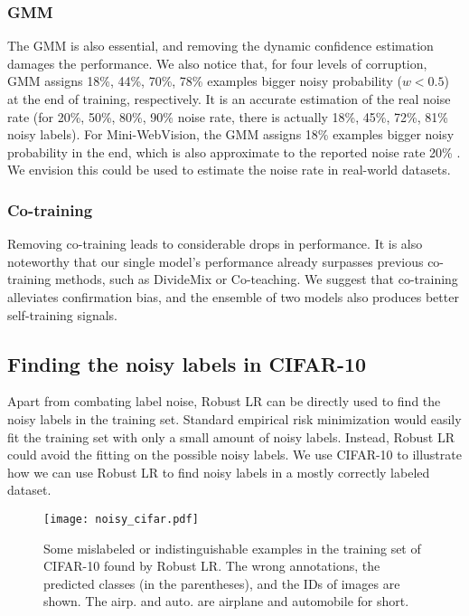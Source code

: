 \documentclass[letterpaper]{article} \usepackage{aaai23}  \usepackage{times}  \usepackage{helvet}  \usepackage{courier}  \usepackage[hyphens]{url}  \usepackage{graphicx} \urlstyle{rm} \def\UrlFont{\rm}  \usepackage{natbib}  \usepackage{caption} \frenchspacing  \setlength{\pdfpagewidth}{8.5in} \setlength{\pdfpageheight}{11in} \usepackage{algorithm}
\begin{document}
\subsubsection{GMM}
The GMM is also essential, and removing the dynamic confidence estimation damages the performance.
We also notice that, for four levels of corruption, GMM assigns 18\%, 44\%, 70\%, 78\% examples bigger noisy probability ($w<0.5$) at the end of training, respectively.
It is an accurate estimation of the real noise rate (for 20\%, 50\%, 80\%, 90\% noise rate, there is actually 18\%, 45\%, 72\%, 81\% noisy labels).
For Mini-WebVision, the GMM assigns 18\% examples bigger noisy probability in the end, which is also approximate to the reported noise rate 20\% \cite{li2017webvision}.
We envision this could be used to estimate the noise rate in real-world datasets.


\subsubsection{Co-training}
Removing co-training leads to considerable drops in performance.
It is also noteworthy that our single model's performance already surpasses previous co-training methods, such as DivideMix or Co-teaching.
We suggest that co-training alleviates confirmation bias, and the ensemble of two models also produces better self-training signals.

\subsection{Finding the noisy labels in CIFAR-10}
Apart from combating label noise, Robust LR can be directly used to find the noisy labels in the training set.
Standard empirical risk minimization would easily fit the training set with only a small amount of noisy labels.
Instead, Robust LR could avoid the fitting on the possible noisy labels.
We use CIFAR-10 to illustrate how we can use Robust LR to find noisy labels in a mostly correctly labeled dataset.

\begin{figure}
    \centering
    \texttt{[image: noisy\_cifar.pdf]} 
    \caption{Some mislabeled or indistinguishable examples in the training set of CIFAR-10 found by Robust LR. 
            The wrong annotations, the predicted classes (in the parentheses), and the IDs of images are shown.
            The airp. and auto. are airplane and automobile for short.
            } 
    \label{labelerror}
\end{figure}
\end{document}
